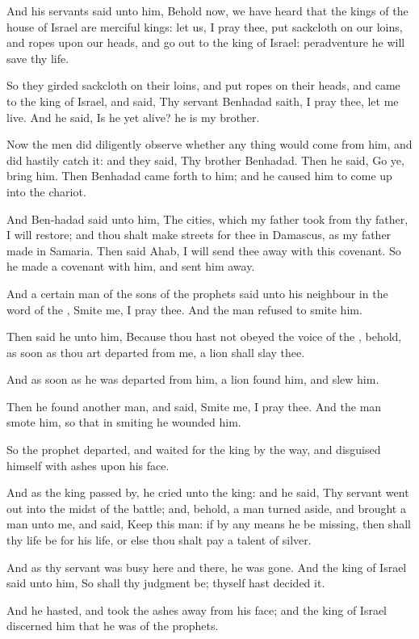 \Verse And his servants said unto him, Behold now, we have heard that the kings of the house of Israel are merciful kings: let us, I pray thee, put sackcloth on our loins, and ropes upon our heads, and go out to the king of Israel: peradventure he will save thy life.

\Verse So they girded sackcloth on their loins, and put ropes on their heads, and came to the king of Israel, and said, Thy servant Benhadad saith, I pray thee, let me live. And he said, Is he yet alive? he is my brother.

\Verse Now the men did diligently observe whether any thing would come from him, and did hastily catch it: and they said, Thy brother Benhadad. Then he said, Go ye, bring him. Then Benhadad came forth to him; and he caused him to come up into the chariot.

\Verse And Ben-hadad said unto him, The cities, which my father took from thy father, I will restore; and thou shalt make streets for thee in Damascus, as my father made in Samaria. Then said Ahab, I will send thee away with this covenant. So he made a covenant with him, and sent him away.

\Verse And a certain man of the sons of the prophets said unto his neighbour in the word of the \LORD, Smite me, I pray thee. And the man refused to smite him.

\Verse Then said he unto him, Because thou hast not obeyed the voice of the \LORD, behold, as soon as thou art departed from me, a lion shall slay thee.

And as soon as he was departed from him, a lion found him, and slew him.

\Verse Then he found another man, and said, Smite me, I pray thee. And the man smote him, so that in smiting he wounded him.

\Verse So the prophet departed, and waited for the king by the way, and disguised himself with ashes upon his face.

\Verse And as the king passed by, he cried unto the king: and he said, Thy servant went out into the midst of the battle; and, behold, a man turned aside, and brought a man unto me, and said, Keep this man: if by any means he be missing, then shall thy life be for his life, or else thou shalt pay a talent of silver.

\Verse And as thy servant was busy here and there, he was gone. And the king of Israel said unto him, So shall thy judgment be; thyself hast decided it.

\Verse And he hasted, and took the ashes away from his face; and the king of Israel discerned him that he was of the prophets.

